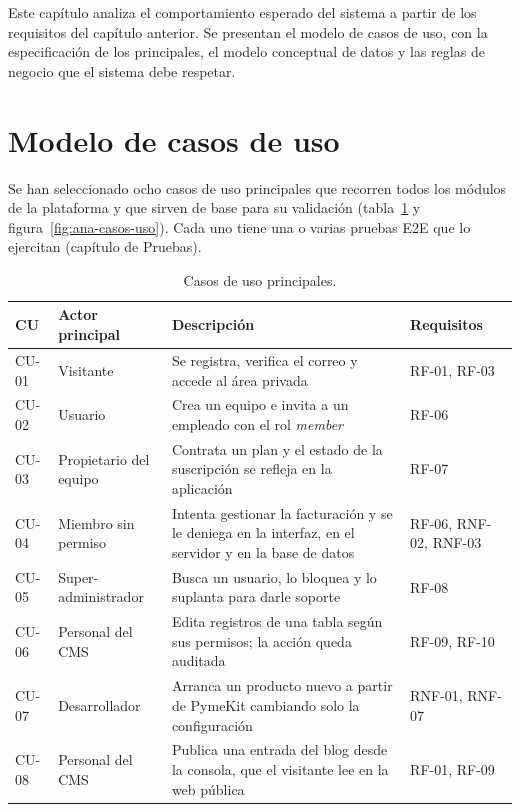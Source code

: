 
Este capítulo analiza el comportamiento esperado del sistema a partir de los
requisitos del capítulo anterior. Se presentan el modelo de casos de uso, con
la especificación de los principales, el modelo conceptual de datos y las
reglas de negocio que el sistema debe respetar.

\section{Modelo de casos de uso}
\label{sec:ana-casos-uso}

Se han seleccionado ocho casos de uso principales que recorren todos los
módulos de la plataforma y que sirven de base para su validación
(tabla~\ref{tab:ana-cu} y figura~\ref{fig:ana-casos-uso}). Cada uno tiene una
o varias pruebas E2E que lo ejercitan (capítulo de Pruebas).

\begin{table}[htbp]
  \centering
  \footnotesize
  \caption{Casos de uso principales.}
  \label{tab:ana-cu}
  \begin{tabularx}{\textwidth}{@{}l>{\raggedright\arraybackslash}p{2.6cm}X>{\raggedright\arraybackslash}p{2.4cm}@{}}
    \toprule
    \textbf{CU} & \textbf{Actor principal} & \textbf{Descripción} & \textbf{Requisitos} \\
    \midrule
    CU-01 & Visitante & Se registra, verifica el correo y accede al área privada & RF-01, RF-03 \\
    CU-02 & Usuario & Crea un equipo e invita a un empleado con el rol \textit{member} & RF-06 \\
    CU-03 & Propietario del equipo & Contrata un plan y el estado de la suscripción se refleja en la aplicación & RF-07 \\
    CU-04 & Miembro sin permiso & Intenta gestionar la facturación y se le deniega en la interfaz, en el servidor y en la base de datos & RF-06, RNF-02, RNF-03 \\
    CU-05 & Super-administrador & Busca un usuario, lo bloquea y lo suplanta para darle soporte & RF-08 \\
    CU-06 & Personal del CMS & Edita registros de una tabla según sus permisos; la acción queda auditada & RF-09, RF-10 \\
    CU-07 & Desarrollador & Arranca un producto nuevo a partir de PymeKit cambiando solo la configuración & RNF-01, RNF-07 \\
    CU-08 & Personal del CMS & Publica una entrada del blog desde la consola, que el visitante lee en la web pública & RF-01, RF-09 \\
    \bottomrule
  \end{tabularx}
\end{table}

